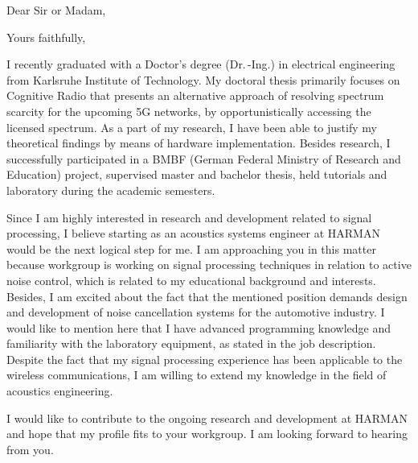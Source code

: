 \documentclass[12pt,a4paper,sans]{moderncv}        %
\begin{document}
\date{\today}
\opening{Dear Sir or Madam,}
\closing{Yours faithfully,}
\makelettertitle
I recently graduated with a Doctor's degree (Dr.\,-Ing.) in electrical engineering from Karlsruhe Institute of Technology. My doctoral thesis primarily focuses on Cognitive Radio that presents an alternative approach of resolving spectrum scarcity for the upcoming 5G networks, by opportunistically accessing the licensed spectrum. As a part of my research, I have been able to justify my theoretical findings by means of hardware implementation. Besides research, I successfully participated in a BMBF (German Federal Ministry of Research and Education) project, supervised master and bachelor thesis, held tutorials and laboratory during the academic semesters. 


Since I am highly interested in research and development related to signal processing, I believe starting as an acoustics systems engineer at HARMAN would be the next logical step for me. I am approaching you in this matter because workgroup is working on signal processing techniques in relation to active noise control, which is related to my educational background and interests. Besides, I am excited about the fact that the mentioned position demands design and development of noise cancellation systems for the automotive industry. I would like to mention here that I have advanced programming knowledge and familiarity with the laboratory equipment, as stated in the job description. Despite the fact that my signal processing experience has been applicable to the wireless communications, I am willing to extend my knowledge in the field of acoustics engineering. 

I would like to contribute to the ongoing research and development at HARMAN and hope that my profile fits to your workgroup. I am looking forward to hearing from you. 


\makeletterclosing
\end{document}

